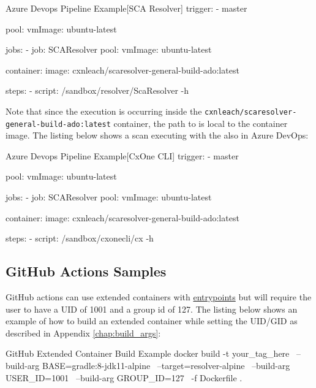 \label{listing:ado_pipeline2}
\begin{code}{Azure Devops Pipeline Example}{[SCA Resolver]}{}
trigger:
    - master

pool:
    vmImage: ubuntu-latest

jobs:
    - job: SCAResolver
        pool:
            vmImage: ubuntu-latest

        container: 
            image: cxnleach/scaresolver-general-build-ado:latest

        steps:
            - script: /sandbox/resolver/ScaResolver -h
\end{code}

Note that since the execution is occurring inside the
\texttt{cxnleach/scaresolver-general-build-ado:latest} container, the path to \scaresolver
is local to the container image.  The listing below shows a scan executing with the \cxonecli
also in Azure DevOps:\\


\label{listing:ado_pipeline_cxone}
\begin{code}{Azure Devops Pipeline Example}{[CxOne CLI]}{}
trigger:
    - master

pool:
    vmImage: ubuntu-latest

jobs:
    - job: SCAResolver
        pool:
            vmImage: ubuntu-latest

        container: 
            image: cxnleach/scaresolver-general-build-ado:latest

        steps:
            - script: /sandbox/cxonecli/cx -h
\end{code}


\subsection{GitHub Actions Samples}

GitHub actions can use extended containers with \hyperref[ssec:entrypoint_targets]{entrypoints} but
will require the user to have a UID of 1001 and a group id of 127.  The listing below shows 
an example of how to build an extended container while setting the UID/GID as described
in Appendix \ref{chap:build_args}:\\

\begin{code}{GitHub Extended Container Build Example}{}{}
docker build -t your_tag_here \
    --build-arg BASE=gradle:8-jdk11-alpine \
    --target=resolver-alpine \
    --build-arg USER_ID=1001 \
    --build-arg GROUP_ID=127 \
    -f Dockerfile .    
\end{code}


